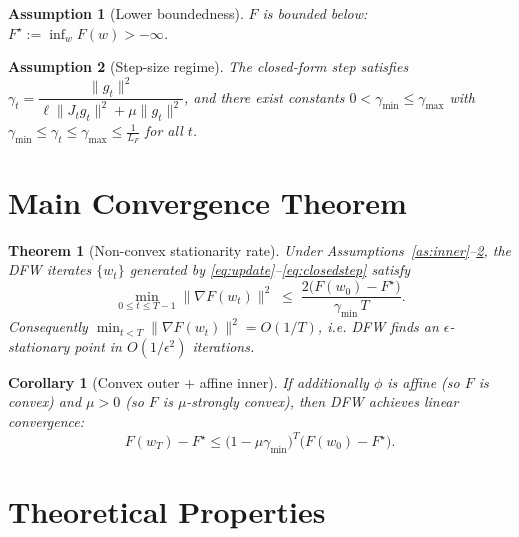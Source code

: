 \documentclass[11pt]{article}
\newtheorem{theorem}{Theorem}
\newtheorem{corollary}{Corollary}
\newtheorem{assumption}{Assumption}
\begin{document}
\begin{assumption}[Lower boundedness]\label{as:lb}
$F$ is bounded below: $F^\star := \inf_w F(w) > -\infty$.
\end{assumption}

\begin{assumption}[Step-size regime]\label{as:step}
The closed-form step satisfies
$\gamma_t = \dfrac{\|g_t\|^2}{\ell\|J_t g_t\|^2 + \mu\|g_t\|^2}$,
and there exist constants $0<\gamma_{\min}\le\gamma_{\max}$ with
$\gamma_{\min}\le \gamma_t \le \gamma_{\max} \le \tfrac{1}{L_F}$ for all $t$.
\end{assumption}

\section*{Main Convergence Theorem}

\begin{theorem}[Non-convex stationarity rate]\label{thm:main}
Under Assumptions~\ref{as:inner}--\ref{as:step}, the DFW iterates
$\{w_t\}$ generated by \eqref{eq:update}--\eqref{eq:closedstep} satisfy
\[
\min_{0\le t \le T-1} \|\nabla F(w_t)\|^2
\;\le\;
\frac{2\big(F(w_0) - F^\star\big)}{\gamma_{\min}\, T}.
\]
Consequently $\min_{t<T}\|\nabla F(w_t)\|^2 = O(1/T)$, i.e. DFW finds an
$\epsilon$-stationary point in $O(1/\epsilon^2)$ iterations.
\end{theorem}

\begin{corollary}[Convex outer + affine inner]\label{cor:convex}
If additionally $\phi$ is affine (so $F$ is convex) and $\mu>0$ (so $F$ is
$\mu$-strongly convex), then DFW achieves linear convergence:
\[
F(w_T) - F^\star \le \Big(1 - \mu\gamma_{\min}\Big)^{T}\big(F(w_0)-F^\star\big).
\]
\end{corollary}

\section*{Theoretical Properties}
\end{document}
